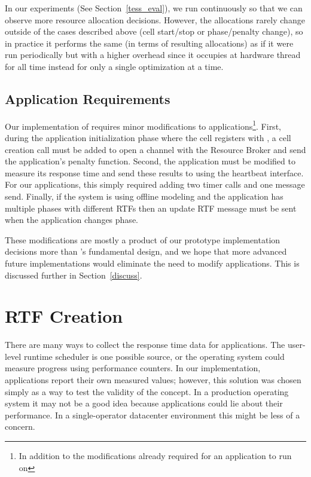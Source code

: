 In our experiments (See Section~\ref{tess_eval}), we run \pacora continuously so that we can observe more resource allocation decisions. However, the allocations rarely change outside of the cases described above (\ie cell start/stop or phase/penalty change), so in practice it performs the same (in terms of resulting allocations) as if it were run periodically but with a higher overhead since it occupies at hardware thread for all time instead for only a single optimization at a time. 

\subsection{Application Requirements}
Our \tess implementation of \pacora requires minor modifications to applications\footnote{In addition to the modifications already required for an application to run on \tess}.  First, during the application initialization phase where the cell registers with \tess, a cell creation call must be added to open a channel with the Resource Broker and send the application's penalty function.  Second, the application must be modified to measure its response time and send these results to \pacora using the heartbeat interface.  For our applications, this simply required adding two timer calls and one message send.  Finally, if the system is using offline modeling and the application has multiple phases with different RTFs then an update RTF message must be sent when the application changes phase.  

These modifications are mostly a product of our prototype implementation decisions more than \pacora's fundamental design, and we hope that more advanced future implementations would eliminate the need to modify applications.   This is discussed further in Section~\ref{discuss}.

\section{RTF Creation}\label{rtf_creation}

There are many ways to collect the response time data for
applications. The user-level runtime scheduler is one possible source,
or the operating system could measure progress using performance
counters.  In our implementation, applications report their own
measured values; however, this solution was chosen simply as a way to
test the validity of the concept.  In a production operating system it
may not be a good idea because applications could lie about their
performance.  In a single-operator datacenter environment this might be less of a concern.

